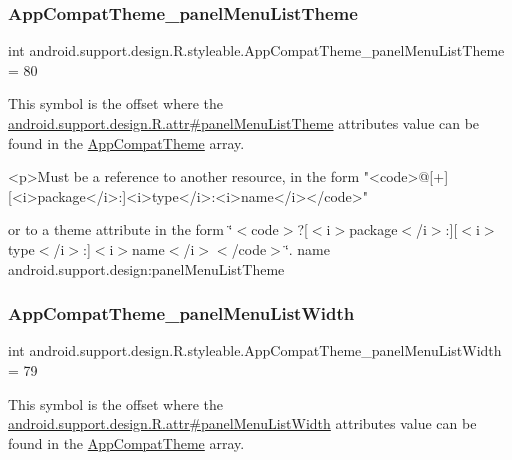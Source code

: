 \subsubsection{\texorpdfstring{App\+Compat\+Theme\+\_\+panel\+Menu\+List\+Theme}{AppCompatTheme\_panelMenuListTheme}}
{\footnotesize\ttfamily int android.\+support.\+design.\+R.\+styleable.\+App\+Compat\+Theme\+\_\+panel\+Menu\+List\+Theme = 80\hspace{0.3cm}{\ttfamily [static]}}

This symbol is the offset where the \hyperlink{classandroid_1_1support_1_1design_1_1R_1_1attr_a3d266bd169b6d7779a9f6d6bd66d28b2}{android.\+support.\+design.\+R.\+attr\#panel\+Menu\+List\+Theme} attribute\textquotesingle{}s value can be found in the \hyperlink{classandroid_1_1support_1_1design_1_1R_1_1styleable_afb351dc8de20cbd4c89abe360373010c}{App\+Compat\+Theme} array.

\begin{DoxyVerb}      <p>Must be a reference to another resource, in the form "<code>@[+][<i>package</i>:]<i>type</i>:<i>name</i></code>"
\end{DoxyVerb}
 or to a theme attribute in the form \char`\"{}$<$code$>$?\mbox{[}$<$i$>$package$<$/i$>$\+:\mbox{]}\mbox{[}$<$i$>$type$<$/i$>$\+:\mbox{]}$<$i$>$name$<$/i$>$$<$/code$>$\char`\"{}.  name android.\+support.\+design\+:panel\+Menu\+List\+Theme \mbox{\label{classandroid_1_1support_1_1design_1_1R_1_1styleable_aeff64b02915a67a11df8dde49e714e6d}} 
\subsubsection{\texorpdfstring{App\+Compat\+Theme\+\_\+panel\+Menu\+List\+Width}{AppCompatTheme\_panelMenuListWidth}}
{\footnotesize\ttfamily int android.\+support.\+design.\+R.\+styleable.\+App\+Compat\+Theme\+\_\+panel\+Menu\+List\+Width = 79\hspace{0.3cm}{\ttfamily [static]}}

This symbol is the offset where the \hyperlink{classandroid_1_1support_1_1design_1_1R_1_1attr_ae2b662feeb9262657fe25b197684e764}{android.\+support.\+design.\+R.\+attr\#panel\+Menu\+List\+Width} attribute\textquotesingle{}s value can be found in the \hyperlink{classandroid_1_1support_1_1design_1_1R_1_1styleable_afb351dc8de20cbd4c89abe360373010c}{App\+Compat\+Theme} array.

